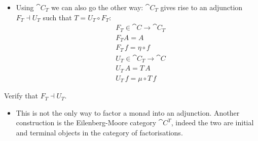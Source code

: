 \documentclass[handout]{beamer}
\begin{document}
\begin{frame}
    \begin{itemize}
    \item Using $\cat{C}_T$ we can also go the other way: $\cat{C}_T$ gives rise to an adjunction
      $F_T \dashv U_T$ such that $T = U_T \circ F_T$:
      \begin{align*}
        & F_T \in \cat{C} \to \cat{C}_T \\
        & F_T A = A \\
        & F_T\,f = \eta \circ f \\
        & U_T \in \cat{C}_T \to \cat{C} \\
        & U_T\,A = T\,A \\
        & U_T\,f = \mu \circ T\,f
      \end{align*}
  \end{itemize}
  \vspace{-3ex}

  \begin{exercise}
    Verify that $F_T \dashv U_T$.
  \end{exercise}

  \begin{itemize}
    \item This is not the only way to factor a monad into an
      adjunction.  Another construction is the Eilenberg-Moore
      category $\cat{C}^T$, indeed the two are initial and terminal objects in the
      category of factorisations.
  \end{itemize}

\end{frame}


\end{document}
